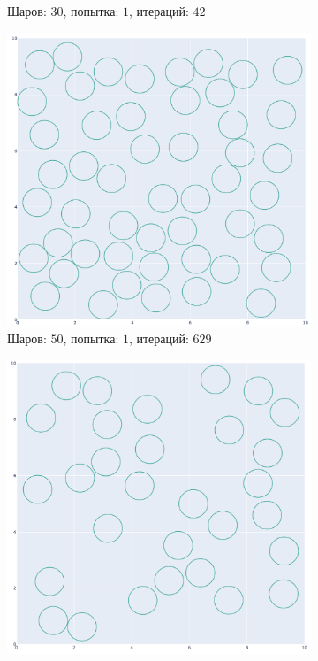\begin{enumerate}
\begin{figure}[h!]
\begin{subfigure}{0.49\textwidth}
            \caption{Шаров: $30$, попытка: $1$, итераций: $42$}
        \end{subfigure}
        \begin{subfigure}{0.49\textwidth}
            \centering
            \includegraphics [width=\imgsize,height=\imgsize]{figures/rand_pack/c50att1iter629totiter629.png}
            \caption{Шаров: $50$, попытка: $1$, итераций: $629$}
        \end{subfigure}
        \begin{subfigure}{0.49\textwidth}
            \centering
            \includegraphics [width=\imgsize,height=\imgsize]{figures/rand_pack/c30att1iter42totiter42.png}

\end{subfigure}
\end{figure}
\end{enumerate}
